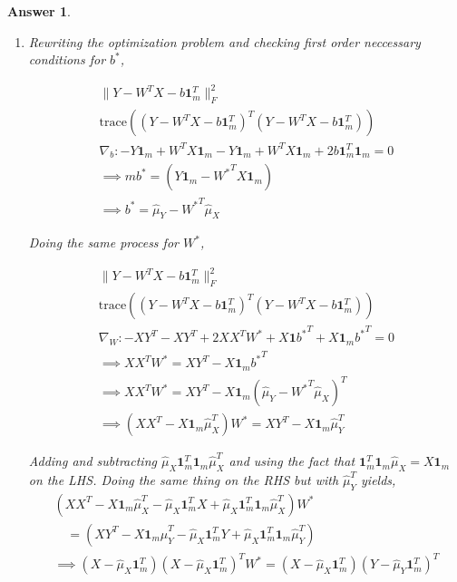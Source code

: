 \documentclass[12pt]{article}
\theoremstyle{colon}
\newtheorem*{answer}{Answer}
\begin{document}
\begin{answer}
  \

  \begin{enumerate}[label=\alph*)]
    \item Rewriting the optimization problem and checking first order neccessary conditions for $b^*$,

      \begin{gather*}
        \lVert Y - W^T X - b \bm{1}_m^T \rVert_F^2 \\
        \text{trace}((Y - W^T X - b \bm{1}_m^T)^T (Y - W^T X - b \bm{1}_m^T)) \\
        \nabla_b: -Y \bm{1}_m + W^T X \bm{1}_m - Y \bm{1}_m + W^T X \bm{1}_m + 2 b \bm{1}_m^T \bm{1}_m = 0\\
        \implies m b^* = (Y \bm{1}_m - {W^*}^T X \bm{1}_m) \\
        \implies b^* = \hat{\mu}_Y - {W^*}^T \hat{\mu}_X
      \end{gather*}

      Doing the same process for $W^*$,

      \begin{gather*}
        \lVert Y - W^T X - b \bm{1}_m^T \rVert_F^2 \\
        \text{trace}((Y - W^T X - b \bm{1}_m^T)^T (Y - W^T X - b \bm{1}_m^T)) \\
        \nabla_W: -XY^T - XY^T + 2 XX^T W^* + X \bm{1} {b^*}^T + X \bm{1}_m {b^*}^T = 0 \\
        \implies XX^T W^* = XY^T - X \bm{1}_m {b^*}^T \\
        \implies XX^T W^* = XY^T - X \bm{1}_m (\hat{\mu}_Y - {W^*}^T \hat{\mu}_X)^T \\
        \implies (XX^T - X \bm{1}_m \hat{\mu}_X^T) W^* = XY^T - X \bm{1}_m \hat{\mu}_Y^T
      \end{gather*}

      Adding and subtracting $\hat{\mu}_X \bm{1}_m^T \bm{1}_m \hat{\mu}_X^T$ and using the fact that $\bm{1}_m^T \bm{1}_m \hat{\mu}_X = X \bm{1}_m$ on the LHS. Doing the same thing on the RHS but with $\hat{\mu}_Y^T$ yields,
      \begin{gather*}
        (XX^T - X \bm{1}_m \hat{\mu}_X^T - \hat{\mu}_X \bm{1}_m^T X + \hat{\mu}_X \bm{1}_m^T \bm{1}_m \hat{\mu}_X^T) W^* \\
        \quad= (XY^T - X \bm{1}_m \hat{\mu}_Y^T - \hat{\mu}_X \bm{1}_m^T Y + \hat{\mu}_X \bm{1}_m^T \bm{1}_m \hat{\mu}_Y^T) \\
        \implies (X - \hat{\mu}_X \bm{1}_m^T)(X - \hat{\mu}_X \bm{1}_m^T)^T W^* = (X - \hat{\mu}_X \bm{1}_m^T)(Y - \hat{\mu}_Y \bm{1}_m^T)^T
      \end{gather*}


\end{enumerate}
\end{answer}
\end{document}
